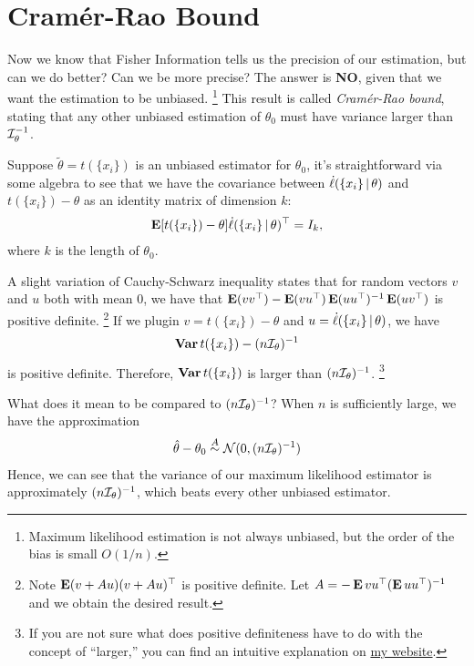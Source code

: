 \documentclass[a4paper]{article}
\begin{document}
\section{Cramér-Rao Bound}

Now we know that Fisher Information tells us the precision of our estimation,
but can we do better?
Can we be more precise?
The answer is \textbf{NO}, given that we want the estimation to be unbiased.
\footnote{
	Maximum likelihood estimation is not always unbiased,
	but the order of the bias is small $O(1/n)$.
}
This result is called \emph{Cramér-Rao bound},
stating that any other unbiased estimation of $\theta_0$ must have variance larger than $\mathcal{I}_{\theta}^{-1}$.

Suppose $\tilde\theta=t(\{x_i\})$ is an unbiased estimator for $\theta_0$,
it's straightforward via some algebra to see that
we have the covariance between $\dot\ell(\{x_i\}\,|\,\theta)$
and $t(\{x_i\})-\theta$ as an identity matrix of dimension $k$:
\begin{align*}
\operatorname{\text{\textrm{\upshape\textbf{E}}}} [t(\{x_i\})-\theta] \dot\ell(\{x_i\}\,|\,\theta)^{\top}
= I_k,
\end{align*}
where $k$ is the length of $\theta_0$.

A slight variation of Cauchy-Schwarz inequality states that
for random vectors $v$ and $u$ both with mean $0$, we have that
$\operatorname{\text{\textrm{\upshape\textbf{E}}}}(vv^{\top}) - \operatorname{\text{\textrm{\upshape\textbf{E}}}}(vu^{\top})\operatorname{\text{\textrm{\upshape\textbf{E}}}}(uu^{\top})^{-1}\operatorname{\text{\textrm{\upshape\textbf{E}}}}(uv^{\top})$
is positive definite. 
\footnote{
	Note $\operatorname{\text{\textrm{\upshape\textbf{E}}}}(v+Au)(v+Au)^{\top}$ is positive definite.
	Let $A=-\operatorname{\text{\textrm{\upshape\textbf{E}}}}{vu^{\top}}(\operatorname{\text{\textrm{\upshape\textbf{E}}}}{uu^{\top}})^{-1}$ and we obtain the desired result.
}
If we plugin $v=t(\{x_i\})-\theta$ and $u=\dot\ell(\{x_i\}\,|\,\theta)$,
we have
\begin{align*}
	\operatorname{\text{\textrm{\upshape\textbf{Var}}}} t(\{x_i\}) - (n\mathcal{I}_{\theta})^{-1}
\end{align*}
is positive definite.
Therefore, $\operatorname{\text{\textrm{\upshape\textbf{Var}}}}{t(\{x_i\})}$ is larger than $(n\mathcal{I}_{\theta})^{-1}$.
\footnote{
	If you are not sure what does positive definiteness have to do with the concept of ``larger,''
	you can find an intuitive explanation on \href{https://jessekelighine.com}{my website}.
}

What does it mean to be compared to $(n\mathcal{I}_\theta)^{-1}$?
When $n$ is sufficiently large, we have the approximation
\begin{align*}
	\hat\theta - \theta_0 \overset{A}{\sim} \mathcal{N}(0,(n\mathcal{I}_\theta)^{-1})
\end{align*}
Hence, we can see that the variance of our maximum likelihood estimator is approximately $(n\mathcal{I}_{\theta})^{-1}$,
which beats every other unbiased estimator.
\end{document}
